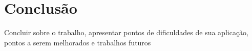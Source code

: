 \chapter{Conclusão}
\label{chap:conclusao}
Concluir sobre o trabalho, apresentar pontos de dificuldades de sua aplicação, pontos a serem melhorados e trabalhos futuros